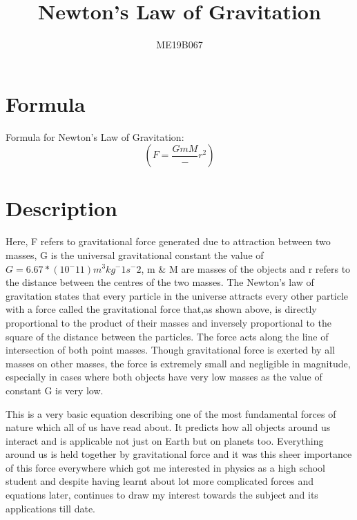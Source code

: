 \documentclass{article}
\title{Newton's Law of Gravitation}
\author{ME19B067}
\begin{document}
\section{Formula}
Formula for Newton's Law of Gravitation: 
$$(F=\frac{GmM}-{r^2})$$
\section{Description}
Here, F refers to gravitational force generated due to attraction between two masses, G is the universal gravitational constant the value of $G=6.67*(10^-11)m^3kg^-1s^-2$, m & M are masses of the objects and r refers to the distance between the centres of the two masses. The Newton's law of gravitation states that every particle in the universe attracts every other particle with a force called the gravitational force that,as shown above, is directly proportional to the product of their masses and inversely proportional to the square of the distance between the particles. The force acts along the line of intersection of both point masses. Though gravitational force is exerted by all masses on other masses, the force is extremely small and negligible in magnitude, especially in cases where both objects have very low masses as the value of constant G is very low.

This is a very basic equation describing one of the most fundamental forces of nature which all of us have read about. It predicts how all objects around us interact and is applicable not just on Earth but on planets too. Everything around us is held together by gravitational force and it was this sheer importance of this force everywhere which got me interested in physics as a high school student and despite having learnt about lot more complicated forces and equations later, continues to draw my interest towards the subject and its applications till date.
\end{document}
